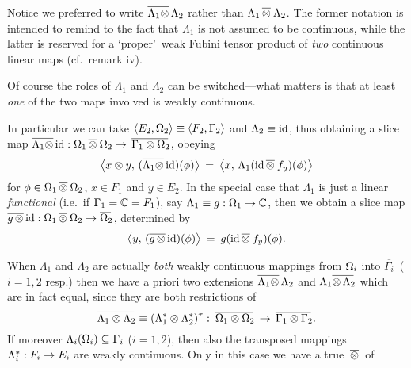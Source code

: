 \begin{remarks_chp}  \label{rem:fubtens_of_maps}
\item
  Notice we preferred to write
  $\overline{\Lambda_1 \otimes}\, \Lambda_2$ rather than
  $\Lambda_1 \,\overline{\otimes}\: \Lambda_2$. The former notation is intended to
  remind to the fact that $\Lambda_1$ is not assumed to be continuous,
  while the latter is reserved for a \lq proper\rq\ weak Fubini
  tensor product of {\em two\/} continuous linear maps (cf.\ remark iv).
\item
  Of course the roles of $\Lambda_1$ and $\Lambda_2$ can be
  switched---what matters is that at least {\em one\/} of the two maps
  involved is weakly continuous.
\item
  In particular we can take $\langle E_2,\Omega_2 \rangle \equiv \langle F_2,\Gamma_2 \rangle$ and
  $\Lambda_2\equiv\mbox{\rm id}$, thus obtaining a slice map
  $ \overline{\Lambda_1 \otimes}\, \mbox{\rm id} :
     \Omega_1 \,\overline{\otimes}\: \Omega_2 \rightarrow \, \overline{\Gamma_1 \otimes \Omega_2\!}\,$,
  obeying
  \begin{equation}  \label{eq:def_Lam1_fubtens_id}
     \pairM{x \tens y}{(\overline{\Lambda_1 \tens}\, \id)(\phi)}
      \:=\:  \pairM{x}{\Lambda_1(\id \fubtens f_y)(\phi)}
  \end{equation}
  for $\phi \in \Omega_1 \,\overline{\otimes}\: \Omega_2$, $x\in F_1$ and $y\in E_2$\@.
  In the special case that $\Lambda_1$ is just a linear {\em functional}
  (i.e.\ if $\Gamma_1 = \mathbb{C} = F_1$),
  say $\Lambda_1 \equiv g : \Omega_1 \rightarrow \mathbb{C}$,
  then we obtain a slice map
  $\overline{g \, \otimes}\, \mbox{\rm id} : \Omega_1 \,\overline{\otimes}\: \Omega_2 \rightarrow \overline{\Omega_2\!}\,$,
  determined by
  \begin{equation}\label{eq:def:functional_fubtens_id}
    \pairM{y}{(\overline{g \,\tens}\, \id)(\phi)}  \:=\:  g(\id \fubtens f_y)(\phi).
  \end{equation}
\item
  When $\Lambda_1$ and $\Lambda_2$ are actually {\em both\/} weakly
  continuous mappings from $\Omega_i$ into $\overline{\Gamma_i\!}\,$
  ($i=1,2$ resp.) then we have a priori two extensions
  $\overline{\Lambda_1 \otimes}\, \Lambda_2$ and
  $\Lambda_1 \overline{\otimes \,\Lambda_2\!}\,$
  which are in fact equal, since they are both restrictions of
  $$ \overline{\Lambda_1 \otimes \Lambda_2\!}\,
     \equiv (\Lambda_1^* \otimes \Lambda_2^*)^\tau : \:
     \overline{\Omega_1\otimes\Omega_2\!}\, \,\rightarrow\, \overline{\Gamma_1 \otimes \Gamma_2\!}\,.$$
  If moreover $\Lambda_i(\Omega_i) \subseteq \Gamma_i$ ($i=1,2$),
  then also the transposed mappings $\Lambda_i^*: F_i \rightarrow E_i$ are weakly
  continuous. Only in this case we have a true $\,\overline{\otimes}\:$ of

\end{remarks_chp}
